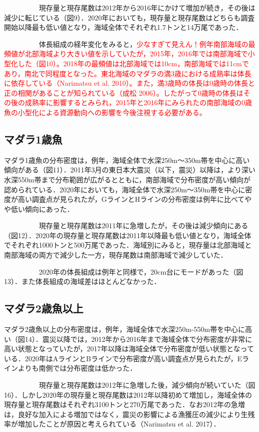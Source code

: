 \documentclass[11pt]{article} %
\begin{document}
\begin{linenumbers}
\ \ \ \ \ \ \ \ \ \ 
現存量と現存尾数は2012年から2016年にかけて増加が続き，その後は減少に転じている（図9）．2020年においても，現存量と現存尾数はどちらも調査開始以降最も低い値となり，海域全体でそれぞれ1.7トンと14万尾であった．

\ \ \ \ \ \ \ \ \ \ 
体長組成の経年変化をみると，\textcolor{red}{少なすぎて見えん！例年南部海域の最頻値が北部海域より大きい値を示していたが，2015年，2016年では南部海域で小型化した（図10）。2018年の最頻値は北部海域では10cm，南部海域では11cmであり，南北で同程度となった。東北海域のマダラの満3歳における成熟率は体長に依存している（Narimatsu et al. 2010）。また，満3歳時の体長は0歳時の体長と正の相関があることが知られている（成松 2006）。したがって0歳時の体長はその後の成熟率に影響するとみられ，2015年と2016年にみられたの南部海域の0歳魚の小型化による資源動向への影響を今後注視する必要がある。}

\subsection{マダラ1歳魚}
マダラ1歳魚の分布密度は，例年，海域全体で水深250m～350m帯を中心に高い傾向がある（図11）．2011年3月の東日本大震災（以下，震災）以降は，より深い水深550m帯まで分布範囲が広がるとともに，南部海域で分布密度が高い傾向が認められている．2020年においても，海域全体で水深250m～350m帯を中心に密度が高い調査点が見られたが，GラインとHラインの分布密度は例年に比べてやや低い傾向にあった．

\ \ \ \ \ \ \ \ \ \ 
現存量と現存尾数は2011年に急増したが，その後は減少傾向にある（図12）．2020年の現存量と現存尾数は2011年以降最も低い値となり，海域全体でそれぞれ1000トンと500万尾であった．海域別にみると，現存量は北部海域と南部海域の両方で減少した一方，現存尾数は南部海域で減少していた．

\ \ \ \ \ \ \ \ \ \ 
2020年の体長組成は例年と同様で，20cm台にモードがあった（図13）．また体長組成の海域差はほとんどなかった．

\subsection{マダラ2歳魚以上}
マダラ2歳魚以上の分布密度は，例年，海域全体で水深250m-550m帯を中心に高い（図14）．震災以降では，2012年から2016年まで海域全体で分布密度が非常に高い状態となっていたが，2017年以降は海域全体で分布密度が低い状態となっている．2020年はAラインとBラインで分布密度が高い調査点が見られたが，Eラインよりも南側では分布密度は低かった．

\ \ \ \ \ \ \ \ \ \ 
現存量と現存尾数は2012年に急増した後，減少傾向が続いていた（図16）．しかし2020年の現存量と現存尾数は2012年以降初めて増加し，海域全体の現存量と現存尾数はそれぞれ3100トンと270万尾であった．なお2012年の急増は，良好な加入による増加ではなく，震災の影響による漁獲圧の減少により生残率が増加したことが原因と考えられている（Narimatsu et al. 2017）．


\end{linenumbers}
\end{document}
